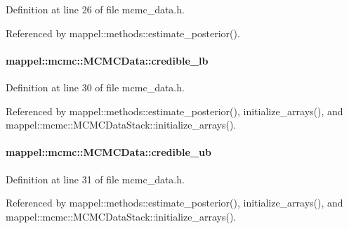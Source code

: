 Definition at line 26 of file mcmc\+\_\+data.\+h.



Referenced by mappel\+::methods\+::estimate\+\_\+posterior().

\paragraph[{\texorpdfstring{credible\+\_\+lb}{credible_lb}}]{ mappel\+::mcmc\+::\+M\+C\+M\+C\+Data\+::credible\+\_\+lb}\hypertarget{structmappel_1_1mcmc_1_1MCMCData_a504c8fa80e064bf56ba2d9dc70fbfcb7}{}\label{structmappel_1_1mcmc_1_1MCMCData_a504c8fa80e064bf56ba2d9dc70fbfcb7}


Definition at line 30 of file mcmc\+\_\+data.\+h.



Referenced by mappel\+::methods\+::estimate\+\_\+posterior(), initialize\+\_\+arrays(), and mappel\+::mcmc\+::\+M\+C\+M\+C\+Data\+Stack\+::initialize\+\_\+arrays().

\paragraph[{\texorpdfstring{credible\+\_\+ub}{credible_ub}}]{ mappel\+::mcmc\+::\+M\+C\+M\+C\+Data\+::credible\+\_\+ub}\hypertarget{structmappel_1_1mcmc_1_1MCMCData_a710e11fed8e8ef6e516171ece46409bc}{}\label{structmappel_1_1mcmc_1_1MCMCData_a710e11fed8e8ef6e516171ece46409bc}


Definition at line 31 of file mcmc\+\_\+data.\+h.



Referenced by mappel\+::methods\+::estimate\+\_\+posterior(), initialize\+\_\+arrays(), and mappel\+::mcmc\+::\+M\+C\+M\+C\+Data\+Stack\+::initialize\+\_\+arrays().

